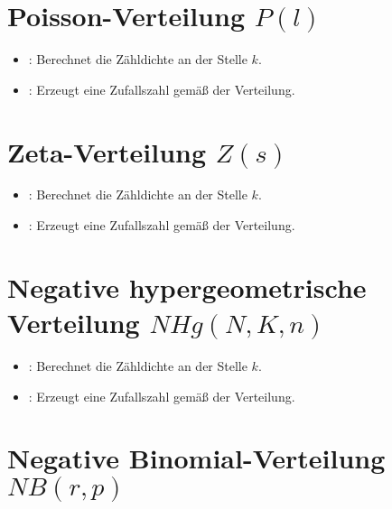 \section{Poisson-Verteilung \texorpdfstring{$P(l)$}{P(l)}}

\begin{itemize}

\item
{}:
Berechnet die Zähldichte an der Stelle $k$.

\item
{}:
Erzeugt eine Zufallszahl gemäß der Verteilung.

\end{itemize}



\section{Zeta-Verteilung \texorpdfstring{$Z(s)$}{Z(s)}}

\begin{itemize}

\item
{}:
Berechnet die Zähldichte an der Stelle $k$.

\item
{}:
Erzeugt eine Zufallszahl gemäß der Verteilung.

\end{itemize}



\section{Negative hypergeometrische Verteilung \texorpdfstring{$NHg(N,K,n)$}{NHg(N,K,n)}}

\begin{itemize}

\item
{}:
Berechnet die Zähldichte an der Stelle $k$.


\item
{}:
Erzeugt eine Zufallszahl gemäß der Verteilung.

\end{itemize}



\section{Negative Binomial-Verteilung \texorpdfstring{$NB(r,p)$}{NB(r,p)}}


